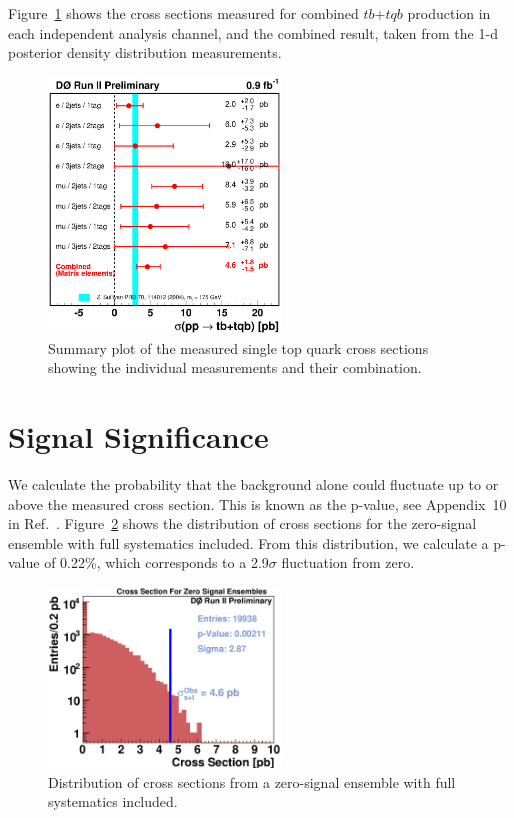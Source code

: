 Figure~\ref{xsec-summary} shows the cross sections measured for
combined $tb$+$tqb$ production in each independent analysis channel,
and the combined result, taken from the 1-d posterior density
distribution measurements.

\begin{figure}[!h!tbp]
\includegraphics[width=0.55\textwidth]
{figures/sintop_xsec_summary.eps}
\begin{minipage}{4in}
\caption[xsecsumm]{Summary plot of the measured single top quark cross
sections showing the individual measurements and their combination.}
\label{xsec-summary}
\end{minipage}
\end{figure}


\section{Signal Significance}

We calculate the probability that the background alone could fluctuate
up to or above the measured cross section. This is known as the
p-value, see Appendix~10 in
Ref.~\cite{general-note}. Figure~\ref{pValue} shows the distribution
of cross sections for the zero-signal ensemble with full systematics
included. From this distribution, we calculate a p-value of 0.22\%,
which corresponds to a 2.9$\sigma$ fluctuation from zero.

\begin{figure}[!h!tbp]
\includegraphics[width=0.55\textwidth]
{figures/ensembles/EnsemblesZero.eps}
\begin{minipage}{4in}
\caption[pValue]{Distribution of cross sections from a zero-signal
ensemble with full systematics included.}
\label{pValue}
\end{minipage}
\end{figure}

